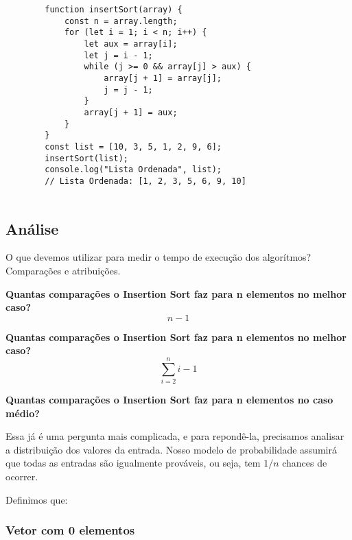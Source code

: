 \documentclass{article}
\begin{document}
    \begin{lstlisting}
        function insertSort(array) {
            const n = array.length;
            for (let i = 1; i < n; i++) {
                let aux = array[i];
                let j = i - 1;
                while (j >= 0 && array[j] > aux) {
                    array[j + 1] = array[j];
                    j = j - 1;
                }
                array[j + 1] = aux;
            }
        }
        const list = [10, 3, 5, 1, 2, 9, 6];
        insertSort(list);
        console.log("Lista Ordenada", list);
        // Lista Ordenada: [1, 2, 3, 5, 6, 9, 10]
    
    \end{lstlisting}
    
    \subsection{Análise}
    \textnormal{O que devemos utilizar para medir o tempo de execução dos algorítmos? Comparações e atribuições.}
    
    \textbf{Quantas comparações o Insertion Sort faz para n elementos no melhor caso?}
    \begin{equation}
    n - 1
    \end{equation}
    
    \textbf{Quantas comparações o Insertion Sort faz para n elementos no melhor caso?} 
    \begin{equation}
        \sum_{i=2}^{n} i-1
    \end{equation}
    
    \textbf{Quantas comparações o Insertion Sort faz para n elementos no caso médio?}
    
    \textnormal{Essa já é uma pergunta mais complicada, e para repondê-la, precisamos analisar a distribuição dos valores da entrada. Nosso modelo de probabilidade assumirá que todas as entradas são igualmente prováveis, ou seja, tem $1/n$ chances de ocorrer.}
    
    \textnormal{Definimos que:\\}
    \indent  {}
    
    
    \subsubsection{Vetor com 0 elementos}
    \indent {}
    
\end{document}
